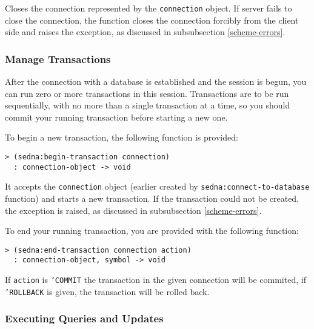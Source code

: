 \documentclass[a4paper,12pt]{article}
\begin{document}
Closes the connection represented by the \texttt{connection} object. If server
fails to close the connection, the function closes the connection forcibly from
the client side and raises the exception, as discussed in subsubsection
\ref{scheme-errors}.


\subsubsection{Manage Transactions}

After the connection with a database is established and the session is begun,
you can run zero or more transactions in this session. Transactions are to be
run sequentially, with no more than a single transaction at a time, so you
should commit your running transaction before starting a new one.

To begin a new transaction, the following function is provided:

\begin{verbatim}
> (sedna:begin-transaction connection)
  : connection-object -> void
\end{verbatim}

It accepts the \texttt{connection} object (earlier created by
\texttt{sedna:connect-to-database} function) and starts a new transaction. If
the transaction could not be created, the exception is raised, as discussed in
subsubsection \ref{scheme-errors}.

To end your running transaction, you are provided with the following function:

\begin{verbatim}
> (sedna:end-transaction connection action)
  : connection-object, symbol -> void
\end{verbatim}

If \texttt{action} is \texttt{'COMMIT} the transaction in the given connection
will be commited, if \texttt{'ROLLBACK} is given, the transaction will be rolled
back.


\subsubsection{Executing Queries and Updates}
\end{document}
